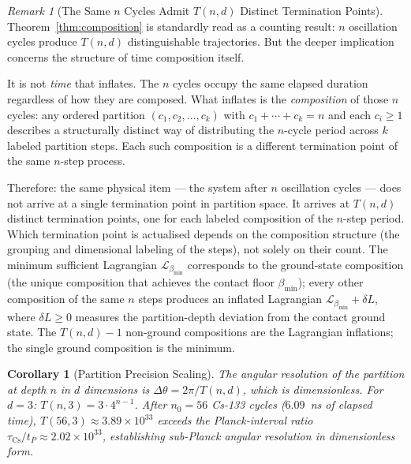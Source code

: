 \documentclass[11pt,twocolumn,a4paper]{article}
\theoremstyle{plain}
\newtheorem{corollary}[theorem]{Corollary}
\theoremstyle{definition}
\theoremstyle{remark}
\newtheorem{remark}[theorem]{Remark}
\newcommand{\bmin}{\beta_{\min}}
\newcommand{\Lmin}{\mathcal{L}_{\bmin}}
\begin{document}
\begin{remark}[The Same $n$ Cycles Admit $T(n,d)$ Distinct Termination Points]
\label{rem:multiple_terminations}
Theorem~\ref{thm:composition} is standardly read as a counting result: $n$
oscillation cycles produce $T(n,d)$ distinguishable trajectories. But the
deeper implication concerns the structure of time composition itself.

It is not \emph{time} that inflates. The $n$ cycles occupy the same elapsed
duration regardless of how they are composed. What inflates is the
\emph{composition} of those $n$ cycles: any ordered partition
$(c_1, c_2, \ldots, c_k)$ with $c_1 + \cdots + c_k = n$ and each $c_i \geq
1$ describes a structurally distinct way of distributing the $n$-cycle period
across $k$ labeled partition steps. Each such composition is a different
termination point of the same $n$-step process.

Therefore: the same physical item --- the system after $n$ oscillation cycles
--- does not arrive at a single termination point in partition space. It
arrives at $T(n,d)$ distinct termination points, one for each labeled
composition of the $n$-step period. Which termination point is actualised
depends on the composition structure (the grouping and dimensional labeling of
the steps), not solely on their count. The minimum sufficient Lagrangian
$\Lmin$ corresponds to the ground-state composition (the unique composition
that achieves the contact floor $\bmin$); every other composition of the same
$n$ steps produces an inflated Lagrangian $\Lmin + \delta L$, where $\delta L
\geq 0$ measures the partition-depth deviation from the contact ground state.
The $T(n,d) - 1$ non-ground compositions are the Lagrangian inflations; the
single ground composition is the minimum.
\end{remark}

\begin{corollary}[Partition Precision Scaling]
\label{cor:precision}
The angular resolution of the partition at depth $n$ in $d$ dimensions is
$\Delta\theta = 2\pi/T(n,d)$, which is dimensionless. For $d = 3$:
$T(n,3) = 3\cdot 4^{n-1}$. After $n_0 = 56$ Cs-133 cycles ($6.09$~ns of elapsed
time), $T(56,3) \approx 3.89 \times 10^{33}$ exceeds the Planck-interval ratio
$\tau_{\mathrm{Cs}}/t_P \approx 2.02\times 10^{33}$, establishing sub-Planck
angular resolution in dimensionless form.
\end{corollary}
\end{document}
